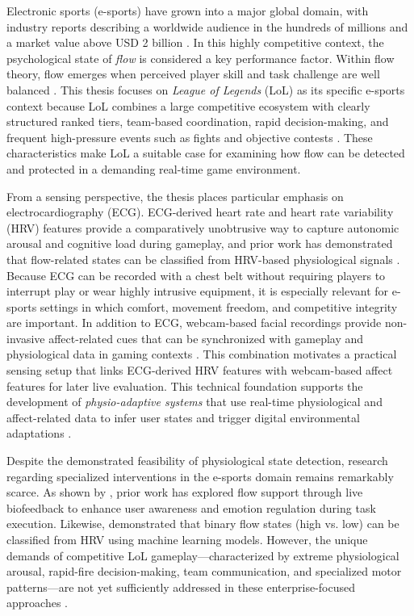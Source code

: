 Electronic sports (e-sports) have grown into a major global domain, with industry reports describing a worldwide audience in the hundreds of millions and a market value above USD 2 billion \autocite{newzoo2024}. In this highly competitive context, the psychological state of \textit{flow} is considered a key performance factor. Within flow theory, flow emerges when perceived player skill and task challenge are well balanced \autocite{inbook,Moneta2012}. This thesis focuses on \textit{League of Legends} (LoL) as its specific e-sports context because LoL combines a large competitive ecosystem with clearly structured ranked tiers, team-based coordination, rapid decision-making, and frequent high-pressure events such as fights and objective contests \autocite{riotgames_lol,gong2020league,10.1145/3549506}. These characteristics make LoL a suitable case for examining how flow can be detected and protected in a demanding real-time game environment.

From a sensing perspective, the thesis places particular emphasis on electrocardiography (ECG). ECG-derived heart rate and heart rate variability (HRV) features provide a comparatively unobtrusive way to capture autonomic arousal and cognitive load during gameplay, and prior work has demonstrated that flow-related states can be classified from HRV-based physiological signals \autocite{9296229}. Because ECG can be recorded with a chest belt without requiring players to interrupt play or wear highly intrusive equipment, it is especially relevant for e-sports settings in which comfort, movement freedom, and competitive integrity are important. In addition to ECG, webcam-based facial recordings provide non-invasive affect-related cues that can be synchronized with gameplay and physiological data in gaming contexts \autocite{kutt2022biraffe2}. This combination motivates a practical sensing setup that links ECG-derived HRV features with webcam-based affect features for later live evaluation. This technical foundation supports the development of \textit{physio-adaptive systems} that use real-time physiological and affect-related data to infer user states and trigger digital environmental adaptations \autocite{irshad2023wearable,ubt_eref88160}.

Despite the demonstrated feasibility of physiological state detection, research regarding specialized interventions in the e-sports domain remains remarkably scarce. As shown by \cite{ubt_eref88160}, prior work has explored flow support through live biofeedback to enhance user awareness and emotion regulation during task execution. Likewise, \cite{9296229} demonstrated that binary flow states (high vs. low) can be classified from HRV using machine learning models. However, the unique demands of competitive LoL gameplay---characterized by extreme physiological arousal, rapid-fire decision-making, team communication, and specialized motor patterns---are not yet sufficiently addressed in these enterprise-focused approaches \autocite{banyai2019psychology,poulus2021determinants,10.1145/3549506}.


